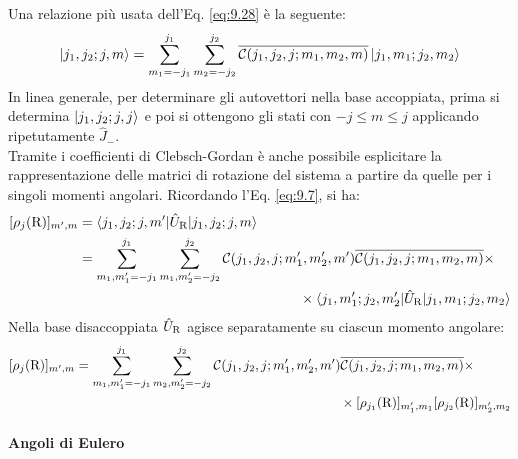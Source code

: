Una relazione più usata dell'Eq. \ref{eq:9.28} è la seguente:
\begin{equation}
	\ket{j_1,j_2 ; j,m} = \sum_{m_1 = -j_1}^{j_1} \sum_{m_2 = -j_2}^{j_2} \overline{\mathcal{C}(j_1,j_2,j ; m_1,m_2,m)} \ket{j_1,m_1 ; j_2,m_2}
	\label{eq:9.34}
\end{equation}
In linea generale, per determinare gli autovettori nella base accoppiata, prima si determina $ \ket{j_1,j_2 ; j,j} $ e poi si ottengono gli stati con $ -j \le m \le j $ applicando ripetutamente $ \hat{J}_- $.\\
Tramite i coefficienti di Clebsch-Gordan è anche possibile esplicitare la rappresentazione delle matrici di rotazione del sistema a partire da quelle per i singoli momenti angolari. Ricordando l'Eq. \ref{eq:9.7}, si ha:
\begin{equation*}
	\begin{split}
		[\rho_j(\mathrm{R})]_{m',m}
		&= \braket{j_1,j_2 ; j,m' | \hat{U}_{\mathrm{R}} | j_1,j_2 ; j,m} \\
		&= \sum_{m_1,m'_1 = -j_1}^{j_1} \sum_{m_1,m'_2 = -j_2}^{j_2} \mathcal{C}(j_1,j_2,j ; m'_1,m'_2,m') \overline{\mathcal{C}(j_1,j_2,j ; m_1,m_2,m)} \times \\
		& \qquad \qquad \qquad \qquad \qquad \qquad \qquad \qquad \times\braket{j_1,m'_1 ; j_2,m'_2 | \hat{U}_{\mathrm{R}} | j_1,m_1 ; j_2,m_2}
	\end{split}
\end{equation*}
Nella base disaccoppiata $ \hat{U}_{\mathrm{R}} $ agisce separatamente su ciascun momento angolare:
\begin{equation}
	\begin{split}
		[\rho_j(\mathrm{R})]_{m',m}
		&= \sum_{m_1,m'_1 = -j_1}^{j_1} \sum_{m_2,m'_2 = -j_2}^{j_2} \mathcal{C}(j_1,j_2,j ; m'_1,m'_2,m') \overline{\mathcal{C}(j_1,j_2,j ; m_1,m_2,m)} \times \\
		& \qquad \qquad \qquad \qquad \qquad \qquad \qquad \qquad \qquad \qquad \times[\rho_{j_1}(\mathrm{R})]_{m'_1,m_1} [\rho_{j_2}(\mathrm{R})]_{m'_2,m_2}
	\end{split}
	\label{eq:9.35}
\end{equation}

\paragraph{Angoli di Eulero}

